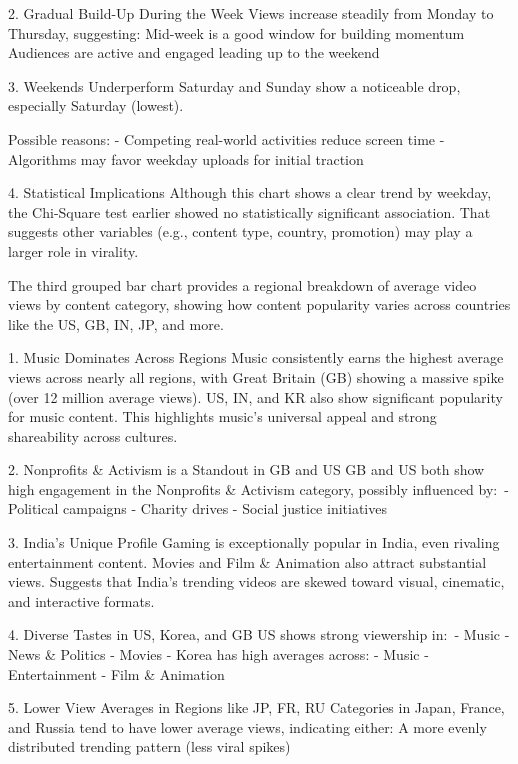 \documentclass[a4paper]{article}
\begin{document}
\begin{multicols}{2}
 2. Gradual Build-Up During the Week
Views increase steadily from Monday to Thursday, suggesting:
Mid-week is a good window for building momentum
Audiences are active and engaged leading up to the weekend

3. Weekends Underperform
Saturday and Sunday show a noticeable drop, especially Saturday (lowest).

Possible reasons:
- Competing real-world activities reduce screen time
- Algorithms may favor weekday uploads for initial traction

 4. Statistical Implications
Although this chart shows a clear trend by weekday, the Chi-Square test earlier showed no statistically significant association.
That suggests other variables (e.g., content type, country, promotion) may play a larger role in virality.







The third grouped bar chart provides a regional breakdown of average video views by content category, showing how content popularity varies across countries like the US, GB, IN, JP, and more.


1. Music Dominates Across Regions
Music consistently earns the highest average views across nearly all regions, with Great Britain (GB) showing a massive spike (over 12 million average views).
US, IN, and KR also show significant popularity for music content.
This highlights music’s universal appeal and strong shareability across cultures.

2. Nonprofits \& Activism is a Standout in GB and US
GB and US both show high engagement in the Nonprofits \& Activism category, possibly influenced by:\
- Political campaigns
- Charity drives
- Social justice initiatives

3. India’s Unique Profile
Gaming is exceptionally popular in India, even rivaling entertainment content.
Movies and Film \& Animation also attract substantial views.
Suggests that India’s trending videos are skewed toward visual, cinematic, and interactive formats.

4. Diverse Tastes in US, Korea, and GB
US shows strong viewership in:\
- Music
- News \& Politics
- Movies
- Korea has high averages across:
- Music
- Entertainment
- Film \& Animation

5. Lower View Averages in Regions like JP, FR, RU
Categories in Japan, France, and Russia tend to have lower average views, indicating either:
A more evenly distributed trending pattern (less viral spikes)


\end{multicols}
\end{document}
